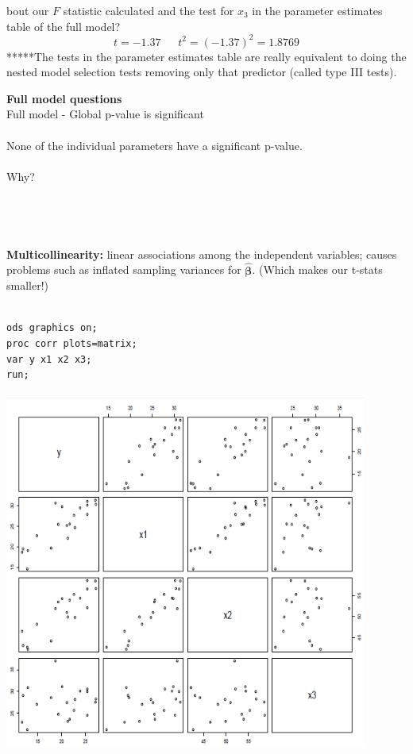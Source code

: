 bout our $F$ statistic calculated and the test for $x_3$ in the parameter estimates table of the full model?$$t=-1.37~~~~~~~t^2=(-1.37)^2=1.8769$$
*****The tests in the parameter estimates table are really equivalent to doing the nested model selection tests removing only that predictor (called type III tests).


\newpage

\textbf{Full model questions}\\
Full model - Global p-value is significant\\~\\
None of the individual parameters have a significant p-value.\\~\\
Why?\\~\\~\\~\\~\\

\textbf{Multicollinearity:} linear associations among the independent variables; causes problems such as inflated sampling variances for $\hat{\boldsymbol{\beta}}$.  (Which makes our t-stats smaller!)\\~\\

\begin{small}
\begin{verbatim}
ods graphics on;
proc corr plots=matrix;
var y x1 x2 x3;
run;
\end{verbatim}
\end{small}

\begin{center}
\includegraphics[height=4.7in,width=4.7in]{bodyfat}
\end{center}

